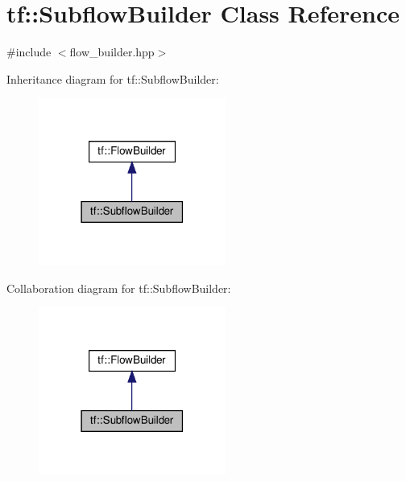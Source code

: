 \hypertarget{classtf_1_1SubflowBuilder}{}\section{tf\+:\+:Subflow\+Builder Class Reference}
\label{classtf_1_1SubflowBuilder}


{\ttfamily \#include $<$flow\+\_\+builder.\+hpp$>$}



Inheritance diagram for tf\+:\+:Subflow\+Builder\+:\nopagebreak
\begin{figure}[H]
\begin{center}
\leavevmode
\includegraphics[width=174pt]{classtf_1_1SubflowBuilder__inherit__graph}
\end{center}
\end{figure}


Collaboration diagram for tf\+:\+:Subflow\+Builder\+:\nopagebreak
\begin{figure}[H]
\begin{center}
\leavevmode
\includegraphics[width=174pt]{classtf_1_1SubflowBuilder__coll__graph}
\end{center}
\end{figure}
